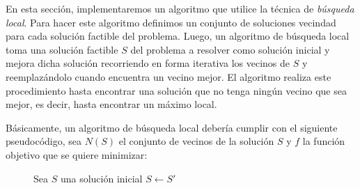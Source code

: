 En esta sección, implementaremos un algoritmo que utilice la técnica de \emph{búsqueda local}. Para hacer este algoritmo definimos un conjunto de soluciones vecindad para cada solución factible del problema. Luego, un algoritmo de búsqueda local toma una solución factible $S$ del problema a resolver como solución inicial y mejora dicha solución recorriendo en forma iterativa los vecinos de $S$ y reemplazándolo cuando encuentra un vecino mejor. El algoritmo realiza este procedimiento hasta encontrar una solución que no tenga ningún vecino que sea mejor, es decir, hasta encontrar un máximo local.

Básicamente, un algoritmo de búsqueda local debería cumplir con el siguiente pseudocódigo, sea $N(S)$ el conjunto de vecinos de la solución $S$ y $f$ la función objetivo que se quiere minimizar:

\begin{center}
 \begin{figure}[H]
  \begin{pseudo}
   \State Sea $S$ una solución inicial
      \State $S \leftarrow S'$
   \EndWhile
   \EndProcedure
  \end{pseudo}
 \end{figure}
\end{center}
